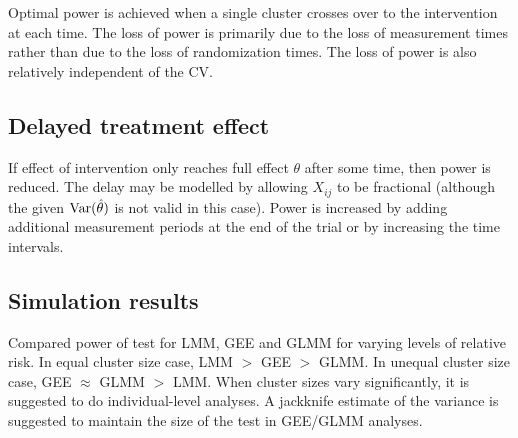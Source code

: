 \documentclass[10pt]{article}
\begin{document}
Optimal power is achieved when a single cluster crosses over to the intervention at each time. The loss of power is primarily due to the loss of measurement times rather than due to the loss of randomization times. The loss of power is also relatively independent of the CV.


\subsection{Delayed treatment effect}

If effect of intervention only reaches full effect $\theta$ after some time, then power is reduced. The delay may be modelled by allowing $X_{ij}$ to be fractional (although the given $\mathrm{Var}(\hat{\theta})$ is not valid in this case). Power is increased by adding additional measurement periods at the end of the trial or by increasing the time intervals.

\subsection{Simulation results}

Compared power of test for LMM, GEE and GLMM for varying levels of relative risk. In equal cluster size case, LMM $>$ GEE $>$ GLMM. In unequal cluster size case, GEE $\approx$ GLMM $>$ LMM. When cluster sizes vary significantly, it is suggested to do individual-level analyses. A jackknife estimate of the variance is suggested to maintain the size of the test in GEE/GLMM analyses.

\fi
\end{document}
